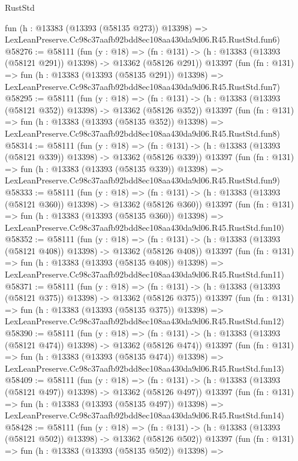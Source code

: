 \begin{lexlean}{RustStd}
\begin{coremodule}
    fun (h : @13383 (@13393 (@58135 @273)) @13398) =>
    LexLeanPreserve.Cc98c37aafb92bdd8ec108aa430da9d06.R45.RustStd.fun6)
@58276 := @58111
    (fun (y : @18) =>
    (fn : @131) -> (h : @13383 (@13393 (@58121 @291)) @13398) -> @13362 (@58126 @291))
    @13397
    (fun (fn : @131) =>
    fun (h : @13383 (@13393 (@58135 @291)) @13398) =>
    LexLeanPreserve.Cc98c37aafb92bdd8ec108aa430da9d06.R45.RustStd.fun7)
@58295 := @58111
    (fun (y : @18) =>
    (fn : @131) -> (h : @13383 (@13393 (@58121 @352)) @13398) -> @13362 (@58126 @352))
    @13397
    (fun (fn : @131) =>
    fun (h : @13383 (@13393 (@58135 @352)) @13398) =>
    LexLeanPreserve.Cc98c37aafb92bdd8ec108aa430da9d06.R45.RustStd.fun8)
@58314 := @58111
    (fun (y : @18) =>
    (fn : @131) -> (h : @13383 (@13393 (@58121 @339)) @13398) -> @13362 (@58126 @339))
    @13397
    (fun (fn : @131) =>
    fun (h : @13383 (@13393 (@58135 @339)) @13398) =>
    LexLeanPreserve.Cc98c37aafb92bdd8ec108aa430da9d06.R45.RustStd.fun9)
@58333 := @58111
    (fun (y : @18) =>
    (fn : @131) -> (h : @13383 (@13393 (@58121 @360)) @13398) -> @13362 (@58126 @360))
    @13397
    (fun (fn : @131) =>
    fun (h : @13383 (@13393 (@58135 @360)) @13398) =>
    LexLeanPreserve.Cc98c37aafb92bdd8ec108aa430da9d06.R45.RustStd.fun10)
@58352 := @58111
    (fun (y : @18) =>
    (fn : @131) -> (h : @13383 (@13393 (@58121 @408)) @13398) -> @13362 (@58126 @408))
    @13397
    (fun (fn : @131) =>
    fun (h : @13383 (@13393 (@58135 @408)) @13398) =>
    LexLeanPreserve.Cc98c37aafb92bdd8ec108aa430da9d06.R45.RustStd.fun11)
@58371 := @58111
    (fun (y : @18) =>
    (fn : @131) -> (h : @13383 (@13393 (@58121 @375)) @13398) -> @13362 (@58126 @375))
    @13397
    (fun (fn : @131) =>
    fun (h : @13383 (@13393 (@58135 @375)) @13398) =>
    LexLeanPreserve.Cc98c37aafb92bdd8ec108aa430da9d06.R45.RustStd.fun12)
@58390 := @58111
    (fun (y : @18) =>
    (fn : @131) -> (h : @13383 (@13393 (@58121 @474)) @13398) -> @13362 (@58126 @474))
    @13397
    (fun (fn : @131) =>
    fun (h : @13383 (@13393 (@58135 @474)) @13398) =>
    LexLeanPreserve.Cc98c37aafb92bdd8ec108aa430da9d06.R45.RustStd.fun13)
@58409 := @58111
    (fun (y : @18) =>
    (fn : @131) -> (h : @13383 (@13393 (@58121 @497)) @13398) -> @13362 (@58126 @497))
    @13397
    (fun (fn : @131) =>
    fun (h : @13383 (@13393 (@58135 @497)) @13398) =>
    LexLeanPreserve.Cc98c37aafb92bdd8ec108aa430da9d06.R45.RustStd.fun14)
@58428 := @58111
    (fun (y : @18) =>
    (fn : @131) -> (h : @13383 (@13393 (@58121 @502)) @13398) -> @13362 (@58126 @502))
    @13397
    (fun (fn : @131) =>
    fun (h : @13383 (@13393 (@58135 @502)) @13398) =>

\end{coremodule}
\end{lexlean}

